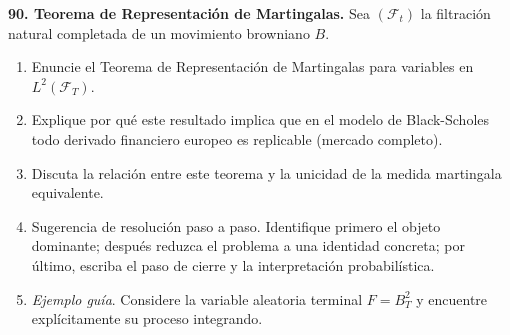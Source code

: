 \documentclass[11pt, letterpaper]{article}
\begin{document}
\newpage
\begin{ejercicio}
    \textbf{90. Teorema de Representación de Martingalas.} Sea $(\mathcal{F}_t)$ la filtración natural completada de un movimiento browniano $B$.
    \begin{enumerate}
        \item Enuncie el Teorema de Representación de Martingalas para variables en $L^2(\mathcal{F}_T)$.
        \item Explique por qué este resultado implica que en el modelo de Black-Scholes todo derivado financiero europeo es replicable (mercado completo).
        \item Discuta la relación entre este teorema y la unicidad de la medida martingala equivalente.
        \item Sugerencia de resolución paso a paso. Identifique primero el objeto dominante; después reduzca el problema a una identidad concreta; por último, escriba el paso de cierre y la interpretación probabilística.
        \item \textit{Ejemplo guía}. Considere la variable aleatoria terminal $F = B_T^2$ y encuentre explícitamente su proceso integrando.
    \end{enumerate}
\end{ejercicio}

\vspace{5mm}
\end{document}
